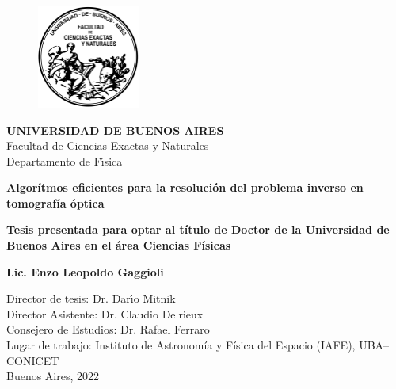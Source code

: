 

\begin{titlepage}
\begin{center}

\begin{figure}[htb]
\center
\includegraphics[width=0.3\textwidth]{figuras/Logo-fcenuba}
\end{figure}
{\bf UNIVERSIDAD DE BUENOS AIRES}\\
Facultad de Ciencias Exactas y Naturales\\
Departamento de F\'{\i}sica

\vspace*{0.5cm}
\begin{Large}
\textbf{Algorítmos eficientes para la resolución 
del problema inverso en tomografía óptica} \\
\end{Large}
\vspace*{0.5cm}
\textbf{Tesis presentada para optar al título de Doctor de la Universidad de 
Buenos Aires en el área Ciencias Físicas}\\

\begin{large}
\textbf{Lic. Enzo Leopoldo Gaggioli}\\
\end{large}

\vspace*{1.0cm}
\begin{flushleft}
Director de tesis: Dr. Dar\'{\i}o Mitnik\\
Director Asistente: Dr. Claudio Delrieux\\
Consejero de Estudios: Dr. Rafael Ferraro\\
\vspace*{0.5cm}
Lugar de trabajo: Instituto de Astronomía y Física del Espacio (IAFE), UBA--CONICET\\
\vspace*{0.5cm}
Buenos Aires, 2022
\end{flushleft}



\end{center}

\end{titlepage}


